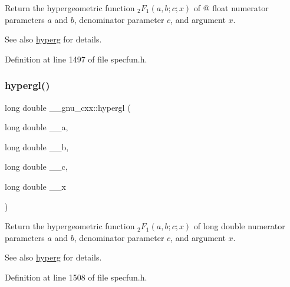 Return the hypergeometric function $ {}_2F_1(a,b;c;x) $ of @ float numerator parameters $ a $ and $ b $, denominator parameter $ c $, and argument $ x $.

\begin{DoxySeeAlso}{See also}
\hyperlink{group__gnu__math__spec__func_ga374198e4076f9e23f3878ca3af70e6da}{hyperg} for details. 
\end{DoxySeeAlso}


Definition at line 1497 of file specfun.\+h.

\mbox{\label{group__gnu__math__spec__func_ga9961967087216e97f76283f29e1be152}} 
\subsubsection{\texorpdfstring{hypergl()}{hypergl()}}
{\footnotesize\ttfamily long double \+\_\+\+\_\+gnu\+\_\+cxx\+::hypergl (\begin{DoxyParamCaption}\item[{long double}]{\+\_\+\+\_\+a,  }\item[{long double}]{\+\_\+\+\_\+b,  }\item[{long double}]{\+\_\+\+\_\+c,  }\item[{long double}]{\+\_\+\+\_\+x }\end{DoxyParamCaption})\hspace{0.3cm}{\ttfamily [inline]}}

Return the hypergeometric function $ {}_2F_1(a,b;c;x) $ of {\ttfamily long double} numerator parameters $ a $ and $ b $, denominator parameter $ c $, and argument $ x $.

\begin{DoxySeeAlso}{See also}
\hyperlink{group__gnu__math__spec__func_ga374198e4076f9e23f3878ca3af70e6da}{hyperg} for details. 
\end{DoxySeeAlso}


Definition at line 1508 of file specfun.\+h.

\mbox{\label{group__gnu__math__spec__func_ga1fa9e260ba85fc043e3d2ada99c0143c}} 
